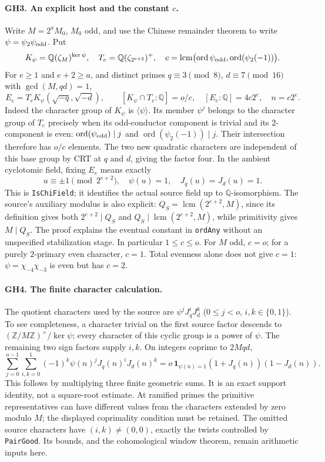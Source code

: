 \paragraph{GH3. An explicit host and the constant $c$.}
Write $M=2^aM_0$, $M_0$ odd, and use the Chinese remainder theorem to write
$\psi=\psi_2\psi_{\rm odd}$.  Put
\[
 K_\psi=\mathbb Q(\zeta_M)^{\ker\psi},\quad
 T_e=\mathbb Q(\zeta_{2^{e+2}})^+,\quad
 c=\operatorname{lcm}\bigl(\operatorname{ord}\psi_{\rm odd},
                  \operatorname{ord}(\psi_2(-1))\bigr).
\]
For $e\ge1$ and $e+2\ge a$, and distinct primes
$q\equiv3\pmod8$, $d\equiv7\pmod{16}$ with $\gcd(M,qd)=1$,
\[
 E_e=T_eK_\psi(\sqrt{-q},\sqrt{-d}),\qquad
 [K_\psi\cap T_e:\mathbb Q]=o/c,\quad
 [E_e:\mathbb Q]=4c2^e,\quad n=c2^e.                 \tag{GH3}
\]
Indeed the character group of $K_\psi$ is $\langle\psi\rangle$.
Its member $\psi^j$ belongs to the character group of $T_e$ precisely
when its odd-conductor component is trivial and its $2$-component is
even: $\operatorname{ord}(\psi_{\rm odd})\mid j$ and
$\operatorname{ord}(\psi_2(-1))\mid j$.  Their intersection therefore
has $o/c$ elements.  The two new quadratic characters are independent
of this base group by CRT at $q$ and $d$, giving the factor four.
In the ambient cyclotomic field, fixing $E_e$ means exactly
\[
 u\equiv\pm1\pmod{2^{e+2}},\quad \psi(u)=1,
 \quad J_q(u)=J_d(u)=1.
\]
This is \texttt{IsChiField}; it identifies the actual source field up to
$\mathbb Q$-isomorphism.  The source's auxiliary modulus is also explicit:
$Q_S=\operatorname{lcm}(2^{e+2},M)$, since its definition gives both
$2^{e+2}\mid Q_S$ and $Q_S\mid\operatorname{lcm}(2^{e+2},M)$,
while primitivity gives $M\mid Q_S$.
The proof explains the eventual constant in \texttt{ordAny} without
an unspecified stabilization stage.  In particular $1\le c\le o$.
For $M$ odd, $c=o$; for a purely $2$-primary even character, $c=1$.
Total evenness alone does not give $c=1$: $\psi=\chi_{-4}\chi_{-3}$
is even but has $c=2$.

\paragraph{GH4. The finite character calculation.}
The quotient characters used by the source are
$\psi^jJ_q^iJ_d^k$ ($0\le j<o$, $i,k\in\{0,1\}$).
To see completeness, a character trivial on the first source factor
descends to $(\mathbb Z/M\mathbb Z)^\times/\ker\psi$; every character
of this cyclic group is a power of $\psi$.  The remaining two sign
factors supply $i,k$.  On integers coprime to $2Mqd$,
\[
 \sum_{j=0}^{o-1}\sum_{i,k=0}^1
   (-1)^k\psi(n)^jJ_q(n)^iJ_d(n)^k
 =o\,\mathbf1_{\psi(n)=1}(1+J_q(n))(1-J_d(n)).       \tag{GH4}
\]
This follows by multiplying three finite geometric sums.
It is an exact support identity, not a square-root estimate.
At ramified primes the primitive representatives can have different
values from the characters extended by zero modulo $M$; the displayed
coprimality condition must be retained.
The omitted source characters have $(i,k)\ne(0,0)$, exactly the twists
controlled by \texttt{PairGood}.  Its bounds, and the cohomological
window theorem, remain arithmetic inputs here.

